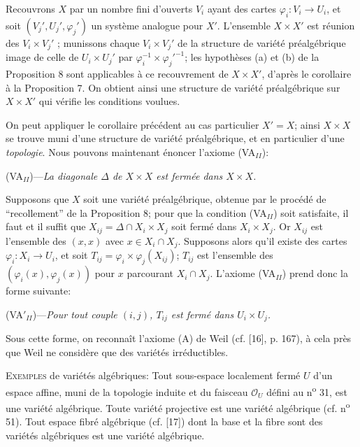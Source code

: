 Recouvrons $X$ par un nombre fini d'ouverts $V_i$ ayant des cartes $\varphi_i : V_i \to U_i$, et soit $(V_j', U_j', \varphi_j')$ un système analogue pour $X'$. L'ensemble $X \times X'$ est réunion des $V_i \times V_j'$ ; munissons chaque $V_i \times V_j'$ de la structure de variété préalgébrique image de celle de $U_i \times U_j'$ par $\varphi_i^{-1} \times {\varphi_j'}^{-1}$; les hypothèses (a) et (b) de la Proposition 8 sont applicables à ce recouvrement de $X \times X'$, d'après le corollaire à la Proposition 7. On obtient ainsi une structure de variété préalgébrique sur $X \times X'$ qui vérifie les conditions voulues.

On peut appliquer le corollaire précédent au cas particulier $X' = X$; ainsi $X \times X$ se trouve muni d'une structure de variété préalgébrique, et en particulier d'une \textit{topologie}. Nous pouvons maintenant énoncer l'axiome (VA$_{II}$):

(VA$_{II}$)---\textit{La diagonale $\Delta$ de $X \times X$ est fermée dans $X \times X$.}

Supposons que $X$ soit une variété préalgébrique, obtenue par le procédé de ``recollement'' de la Proposition 8; pour que la condition (VA$_{II}$) soit satisfaite, il faut et il suffit que $X_{ij} = \Delta \cap X_i \times X_j$ soit fermé dans $X_i \times X_j$. Or $X_{ij}$ est l'ensemble des $(x, x)$ avec $x \in X_i \cap X_j$. Supposons alors qu'il existe des cartes $\varphi_i : X_i \to U_i$, et soit $T_{ij} = \varphi_i \times \varphi_j(X_{ij})$; $T_{ij}$ est l'ensemble des $(\varphi_i(x), \varphi_j(x))$ pour $x$ parcourant $X_i \cap X_j$. L'axiome (VA$_{II}$) prend donc la forme suivante:

(VA$'_{II}$)---\textit{Pour tout couple $(i, j)$, $T_{ij}$ est fermé dans $U_i \times U_j$.}

Sous cette forme, on reconnaît l'axiome (A) de Weil (cf. [16], p. 167), à cela près que Weil ne considère que des variétés irréductibles.

\textsc{Exemples} de variétés algébriques: Tout sous-espace localement fermé $U$ d'un espace affine, muni de la topologie induite et du faisceau $\mathcal{O}_U$ défini au n\textsuperscript{o} 31, est une variété algébrique. Toute variété projective est une variété algébrique (cf. n\textsuperscript{o} 51). Tout espace fibré algébrique (cf. [17]) dont la base et la fibre sont des variétés algébriques est une variété algébrique.



